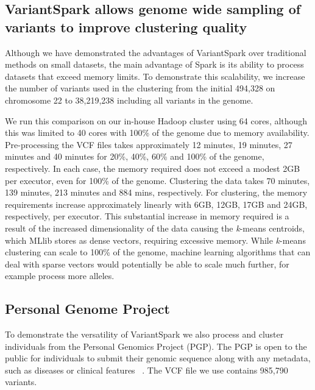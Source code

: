 \documentclass{bmcart}
\newcommand{\variantSpark}{{\sc VariantSpark}}
\newcommand{\kMeans}{\textit{k}-means}
\begin{document}
\subsection*{\variantSpark{} allows genome wide sampling of variants to improve clustering quality}

Although we have demonstrated the advantages of \variantSpark{} over traditional methods on small datasets, the main advantage of {\sc Spark} is its ability to process datasets that exceed memory limits.
To demonstrate this scalability, we increase the number of variants used in the clustering from the initial 494,328 on chromosome 22 to 38,219,238 including all variants in the genome.

We run this comparison on our in-house Hadoop cluster using 64 cores, although this was limited to 40 cores with 100\% of the genome due to memory availability.
Pre-processing the VCF files takes approximately 12 minutes, 19 minutes, 27 minutes and 40 minutes for 20\%, 40\%, 60\% and 100\% of the genome, respectively.
In each case, the memory required does not exceed a modest 2GB per executor, even for 100\% of the genome. 
Clustering the data takes 70 minutes, 139 minutes, 213 minutes and 884 mins, respectively.
For clustering, the memory requirements increase approximately linearly with 6GB, 12GB, 17GB and 24GB, respectively, per executor. 
This substantial increase in memory required is a result of the increased dimensionality of the data causing the \kMeans{} centroids, which MLlib stores as dense vectors, requiring excessive memory.  
While \kMeans{} clustering can scale to 100\% of the genome, machine learning algorithms that can deal with sparse vectors would potentially be able to scale much further, for example process more alleles.


\subsection*{Personal Genome Project}
To demonstrate the versatility of \variantSpark{} we also process and cluster individuals from the Personal Genomics Project (PGP). The PGP is open to the public for individuals to submit their genomic sequence along with any metadata, such as diseases or clinical features ~\cite{Lunshof2013}.
The VCF file we use contains 985,790 variants.
\end{document}
